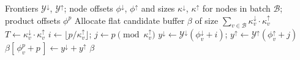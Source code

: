 \documentclass[letterpaper]{article}
\begin{document}
\begin{algorithm}[tbp]
\caption{GPU Subroutine: Materialize Cutset Products}
\label{alg:materialize_cutset_products}
\begin{algorithmic}[1]
\Require Frontiers $\mathcal{Y}^{\downarrow}$, $\mathcal{Y}^{\uparrow}$; node offsets $\phi^{\downarrow}$, $\phi^{\uparrow}$ and sizes $\kappa^{\downarrow}$, $\kappa^{\uparrow}$ for nodes in batch $\mathcal{B}$; product offsets $\phi^p$
\State Allocate flat candidate buffer $\beta$ of size $\sum_{v \in \mathcal{B}} \kappa^{\downarrow}_v \cdot \kappa^{\uparrow}_v$
 
    \State $T \gets \kappa^{\downarrow}_v \cdot \kappa^{\uparrow}_v$ 
        \State $i \gets \lfloor p / \kappa^{\uparrow}_v \rfloor$; \quad $j \gets p \pmod{\kappa^{\uparrow}_v}$
        \State $y^{\downarrow} \gets \mathcal{Y}^{\downarrow}(\phi^{\downarrow}_v + i)$; \quad $y^{\uparrow} \gets \mathcal{Y}^{\uparrow}(\phi^{\uparrow}_v + j)$
        \State $\beta[\,\phi^p_v + p\,] \gets y^{\downarrow} + y^{\uparrow}$
    \EndFor
\EndFor
\State \Return $\beta$
\EndProcedure
\end{algorithmic}
\end{algorithm}
\end{document}

